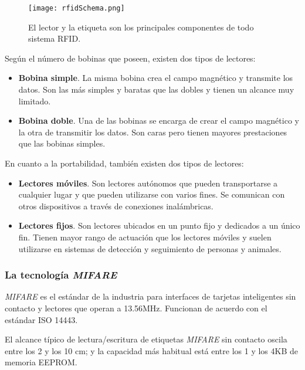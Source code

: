   \begin{figure}[!h]
    \begin{center}
      \texttt{[image: rfidSchema.png]}
      \caption{El lector y la etiqueta son los principales componentes de todo
sistema \acs{RFID}.}
      \label{fig:rfidSchema}
    \end{center}
  \end{figure}

  Según el número de bobinas que poseen, existen dos tipos de lectores:
  \begin{itemize}
  \item \textbf{Bobina simple}. La misma bobina crea el campo magnético y
  transmite los datos. Son las más simples y baratas que las dobles y tienen
  un alcance muy limitado.
  \item \textbf{Bobina doble}. Una de las bobinas se encarga de crear el
  campo magnético y la otra de transmitir los datos. Son caras pero tienen
  mayores prestaciones que las bobinas simples.
  \end{itemize}
  
  En cuanto a la portabilidad, también existen dos tipos de lectores:
  \begin{itemize}
  \item \textbf{Lectores móviles}. Son lectores autónomos que pueden 
  transportarse a cualquier lugar y que pueden utilizarse con varios fines. Se
  comunican con otros dispositivos a través de conexiones inalámbricas.
  \item \textbf{Lectores fijos}. Son lectores ubicados en un punto fijo y 
  dedicados a un único fin. Tienen mayor rango de actuación que los lectores
  móviles y suelen utilizarse en sistemas de detección y seguimiento de
  personas y animales.
  \end{itemize}

    \subsubsection{La tecnología \emph{MIFARE}}
  \emph{MIFARE} es el estándar de la industria para interfaces de
  tarjetas inteligentes sin contacto y lectores que operan a 13.56MHz.
  Funcionan de acuerdo con el estándar \acs{ISO} 14443\cite{bib:mifare}.
  
  El alcance típico de lectura/escritura de etiquetas \emph{MIFARE} sin
  contacto oscila entre los 2 y los 10 cm; y la capacidad más habitual está
  entre los 1 y los 4KB de memoria \acs{EEPROM}.

